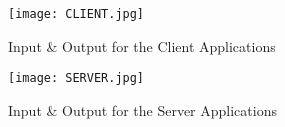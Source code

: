 \documentclass{article}
\begin{document}
\newpage

\begin{figure}[ht]
\caption{Input \& Output for the Client Applications}
\centering
\texttt{[image: CLIENT.jpg]}
\end{figure}



\begin{figure}[ht]
\caption{Input \& Output for the Server Applications}
\centering
\texttt{[image: SERVER.jpg]}
\end{figure}
\end{document}
